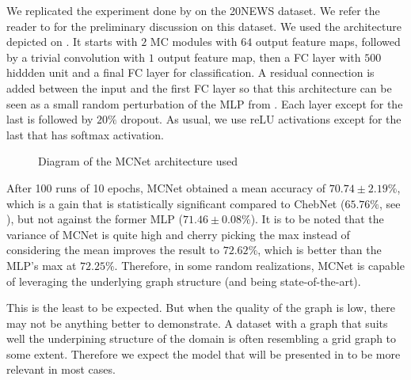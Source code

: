 We replicated the experiment done by \cite{defferrard2016convolutional} on the 20NEWS dataset. We refer the reader to  for the preliminary discussion on this dataset. We used the architecture depicted on . It starts with $2$ MC modules with $64$ output feature maps, followed by a trivial convolution with $1$ output feature map, then a FC layer with $500$ hiddden unit and a final FC layer for classification. A residual connection is added between the input and the first FC layer so that this architecture can be seen as a small random perturbation of the MLP from . Each layer except for the last is followed by $20\%$ dropout. As usual, we use reLU activations except for the last that has softmax activation.

\begin{figure}[h!tbp]
\centering
{}
\caption{Diagram of the MCNet architecture used}
\label{fig:archiMC}
\end{figure}

After 100 runs of 10 epochs, MCNet obtained a mean accuracy of $70.74 \pm 2.19\%$, which is a gain that is statistically significant compared to ChebNet ($65.76\%$, see ), but not against the former MLP ($71.46 \pm 0.08\%$). It is to be noted that the variance of MCNet is quite high and cherry picking the max instead of considering the mean improves the result to $72.62\%$, which is better than the MLP's max at $72.25\%$. Therefore, in some random realizations, MCNet is capable of leveraging the underlying graph structure (and being state-of-the-art).

This is the least to be expected. But when the quality of the graph is low, there may not be anything better to demonstrate. A dataset with a graph that suits well the underpining structure of the domain is often resembling a grid graph to some extent. Therefore we expect the model that will be presented in  to be more relevant in most cases.

